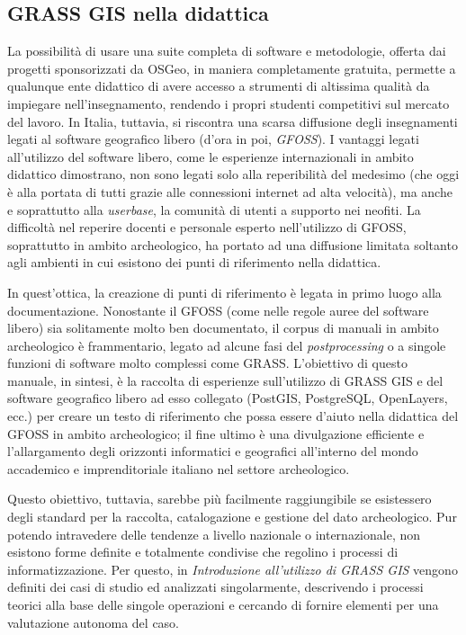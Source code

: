 \documentclass{article}
\begin{document}
\begin{multicols}{2}
		\section{GRASS GIS nella didattica\label{sec:grass-didattica}}
			La possibilità di usare una suite completa di software e metodologie, offerta dai progetti sponsorizzati da OSGeo, in maniera completamente gratuita, permette a qualunque ente didattico di avere accesso a strumenti di altissima qualità da impiegare nell'insegnamento, rendendo i propri studenti competitivi sul mercato del lavoro. In Italia, tuttavia, si riscontra una scarsa diffusione degli insegnamenti legati al software geografico libero (d'ora in poi, \emph{GFOSS}). I vantaggi legati all'utilizzo del software libero, come le esperienze internazionali in ambito didattico dimostrano, non sono legati solo alla reperibilità del medesimo (che oggi è alla portata di tutti grazie alle connessioni internet ad alta velocità), ma anche e soprattutto alla \emph{userbase}, la comunità di utenti a supporto nei neofiti. La difficoltà nel reperire docenti e personale esperto nell'utilizzo di GFOSS, soprattutto in ambito archeologico, ha portato ad una diffusione limitata soltanto agli ambienti in cui esistono dei punti di riferimento nella didattica.

			In quest'ottica, la creazione di punti di riferimento è legata in primo luogo alla documentazione. Nonostante il GFOSS (come nelle regole auree del software libero) sia solitamente molto ben documentato, il corpus di manuali in ambito archeologico è frammentario, legato ad alcune fasi del \emph{postprocessing} o a singole funzioni di software molto complessi come GRASS. L'obiettivo di questo manuale, in sintesi, è la raccolta di esperienze sull'utilizzo di GRASS GIS e del software geografico libero ad esso collegato (PostGIS, PostgreSQL, OpenLayers, ecc.) per creare un testo di riferimento che possa essere d'aiuto nella didattica del GFOSS in ambito archeologico; il fine ultimo è una divulgazione efficiente e l'allargamento degli orizzonti informatici e geografici all'interno del mondo accademico e imprenditoriale italiano nel settore archeologico.

			Questo obiettivo, tuttavia, sarebbe più facilmente raggiungibile se esistessero degli standard per la raccolta, catalogazione e gestione del dato archeologico. Pur potendo intravedere delle tendenze a livello nazionale o internazionale, non esistono forme definite e totalmente condivise che regolino i processi di informatizzazione. Per questo, in \emph{Introduzione all'utilizzo di GRASS GIS} vengono definiti dei casi di studio ed analizzati singolarmente, descrivendo i processi teorici alla base delle singole operazioni e cercando di fornire elementi per una valutazione autonoma del caso.


\end{multicols}
\end{document}
